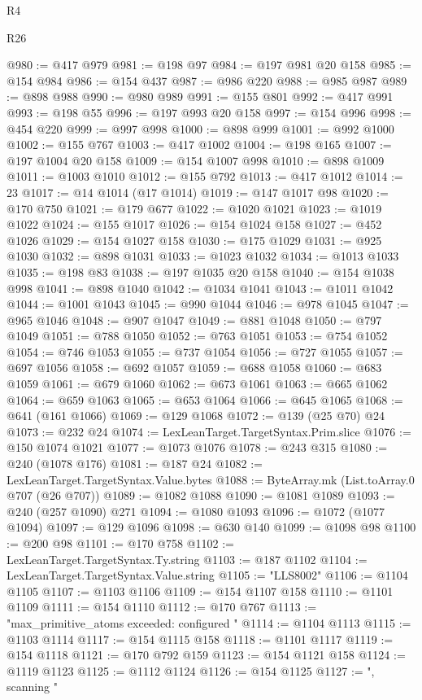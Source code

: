 \begin{lexlean}{R4}
\begin{lexlean}{R26}
\begin{coremodule}
{{{{{{{{{{{{{{{{{{{{{{{{{{{{{{{{{{{{{{{{{{{{{{{{{{{{{{{{{{{{{{{{{{{{{{{{@980 := @417 @979
@981 := @198 @97
@984 := @197 @981 @20 @158
@985 := @154 @984
@986 := @154 @437
@987 := @986 @220
@988 := @985 @987
@989 := @898 @988
@990 := @980 @989
@991 := @155 @801
@992 := @417 @991
@993 := @198 @55
@996 := @197 @993 @20 @158
@997 := @154 @996
@998 := @454 @220
@999 := @997 @998
@1000 := @898 @999
@1001 := @992 @1000
@1002 := @155 @767
@1003 := @417 @1002
@1004 := @198 @165
@1007 := @197 @1004 @20 @158
@1009 := @154 @1007 @998
@1010 := @898 @1009
@1011 := @1003 @1010
@1012 := @155 @792
@1013 := @417 @1012
@1014 := 23
@1017 := @14 @1014 (@17 @1014)
@1019 := @147 @1017 @98
@1020 := @170 @750
@1021 := @179 @677
@1022 := @1020 @1021
@1023 := @1019 @1022
@1024 := @155 @1017
@1026 := @154 @1024 @158
@1027 := @452 @1026
@1029 := @154 @1027 @158
@1030 := @175 @1029
@1031 := @925 @1030
@1032 := @898 @1031
@1033 := @1023 @1032
@1034 := @1013 @1033
@1035 := @198 @83
@1038 := @197 @1035 @20 @158
@1040 := @154 @1038 @998
@1041 := @898 @1040
@1042 := @1034 @1041
@1043 := @1011 @1042
@1044 := @1001 @1043
@1045 := @990 @1044
@1046 := @978 @1045
@1047 := @965 @1046
@1048 := @907 @1047
@1049 := @881 @1048
@1050 := @797 @1049
@1051 := @788 @1050
@1052 := @763 @1051
@1053 := @754 @1052
@1054 := @746 @1053
@1055 := @737 @1054
@1056 := @727 @1055
@1057 := @697 @1056
@1058 := @692 @1057
@1059 := @688 @1058
@1060 := @683 @1059
@1061 := @679 @1060
@1062 := @673 @1061
@1063 := @665 @1062
@1064 := @659 @1063
@1065 := @653 @1064
@1066 := @645 @1065
@1068 := @641 (@161 @1066)
@1069 := @129 @1068
@1072 := @139 (@25 @70) @24
@1073 := @232 @24
@1074 := LexLeanTarget.TargetSyntax.Prim.slice
@1076 := @150 @1074 @1021
@1077 := @1073 @1076
@1078 := @243 @315
@1080 := @240 (@1078 @176)
@1081 := @187 @24
@1082 := LexLeanTarget.TargetSyntax.Value.bytes
@1088 := ByteArray.mk (List.toArray.{0} @707 (@26 @707))
@1089 := @1082 @1088
@1090 := @1081 @1089
@1093 := @240 (@257 @1090) @271
@1094 := @1080 @1093
@1096 := @1072 (@1077 @1094)
@1097 := @129 @1096
@1098 := @630 @140
@1099 := @1098 @98
@1100 := @200 @98
@1101 := @170 @758
@1102 := LexLeanTarget.TargetSyntax.Ty.string
@1103 := @187 @1102
@1104 := LexLeanTarget.TargetSyntax.Value.string
@1105 := "LLS8002"
@1106 := @1104 @1105
@1107 := @1103 @1106
@1109 := @154 @1107 @158
@1110 := @1101 @1109
@1111 := @154 @1110
@1112 := @170 @767
@1113 := "max_primitive_atoms exceeded: configured "
@1114 := @1104 @1113
@1115 := @1103 @1114
@1117 := @154 @1115 @158
@1118 := @1101 @1117
@1119 := @154 @1118
@1121 := @170 @792 @159
@1123 := @154 @1121 @158
@1124 := @1119 @1123
@1125 := @1112 @1124
@1126 := @154 @1125
@1127 := ", scanning "
}}}}}}}}}}}}}}}}}}}}}}}}}}}}}}}}}}}}}}}}}}}}}}}}}}}}}}}}}}}}}}}}}}}}}}}}
\end{coremodule}
\end{lexlean}
\end{lexlean}
